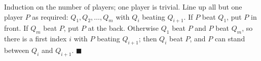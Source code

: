 Induction on the number of players; one player is trivial. Line up all but one player $P$ as required: $Q_1,Q_2,\dots,Q_m$ with $Q_i$ beating $Q_{i+1}$. If $P$ beat $Q_1$, put $P$ in front. If $Q_m$ beat $P$, put $P$ at the back. Otherwise $Q_1$ beat $P$ and $P$ beat $Q_m$, so there is a first index $i$ with $P$ beating $Q_{i+1}$; then $Q_i$ beat $P$, and $P$ can stand between $Q_i$ and $Q_{i+1}$. $\blacksquare$
